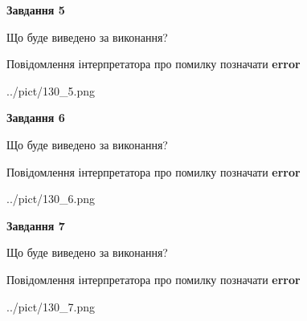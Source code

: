 \documentclass[10pt, ukrainian]{article}
\begin{document}
{\begin {large}
{\begin {center}\textbf{Завдання 5}\end {center}}\par
Що буде виведено за виконання? \par
Повідомлення інтерпретатора про помилку позначати \textbf{error}

\begin{center}
	{../pict/130_5.png}
\end{center}
\newpage

{\begin {center}\textbf{Завдання 6}\end {center}}\par
Що буде виведено за виконання? \par
Повідомлення інтерпретатора про помилку позначати \textbf{error}

\begin{center}
	{../pict/130_6.png}
\end{center}
\newpage

{\begin {center}\textbf{Завдання 7}\end {center}}\par
Що буде виведено за виконання? \par
Повідомлення інтерпретатора про помилку позначати \textbf{error}

\begin{center}
	{../pict/130_7.png}
\end{center}
\newpage

\end {large}}
\end{document}
